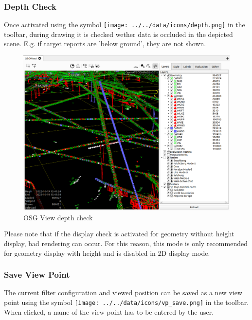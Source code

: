 \subsubsection{Depth Check}

Once activated using the symbol \texttt{[image: ../../data/icons/depth.png]} in the toolbar, during drawing it is checked wether data is occluded in the depicted scene. E.g. if target reports are 'below ground', they are not shown.

\begin{figure}[H]
    \hspace*{-2cm}
    \includegraphics[width=18cm,frame]{figures/osgview_depth_check.png}
  \caption{OSG View depth check}
\end{figure}

Please note that if the display check is activated for geometry without height display, bad rendering can occur. For this reason, this mode is only recommended for geometry display with height and is disabled in 2D display mode.

\subsubsection{Save View Point}

The current filter configuration and viewed position can be saved as a new view point using the symbol \texttt{[image: ../../data/icons/vp\_save.png]} in the toolbar. When clicked, a name of the view point has to be entered by the user. 

